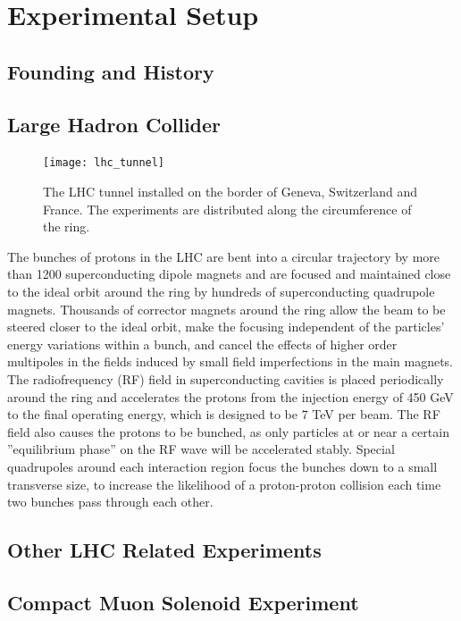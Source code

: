 \chapter{Experimental Setup }

\section{Founding and History}

\section{Large Hadron Collider}

\begin{figure}
\begin{center}
\texttt{[image: lhc\_tunnel]}
\caption{The LHC tunnel installed on the border of Geneva, Switzerland and France. 
The experiments are distributed along the circumference of the ring.}
\end{center}
\end{figure}

The bunches of protons in the LHC are bent into a circular trajectory by more than 1200
 superconducting dipole magnets and are focused and maintained close to the ideal
 orbit around the ring by hundreds of superconducting quadrupole magnets. 
Thousands of corrector magnets around the ring allow the beam to be steered closer 
to the ideal orbit, make the focusing independent of the particles’ energy variations
 within a bunch, and cancel the effects of higher order multipoles in the fields induced 
by small field imperfections in the main magnets. 
The radiofrequency (RF) field in superconducting cavities is placed periodically around 
the ring and accelerates the protons from the injection energy of 450 GeV to the final
 operating energy, which is designed to be 7 TeV per beam. The RF field also causes the
 protons to be bunched, as only particles at or near a certain ”equilibrium phase” on 
the RF wave will be accelerated stably. Special quadrupoles around each interaction region
 focus the bunches down to a small transverse size, to increase the likelihood of a
 proton-proton collision each time two bunches pass through each other.

\section{Other LHC Related Experiments}

\section{Compact Muon Solenoid Experiment}

